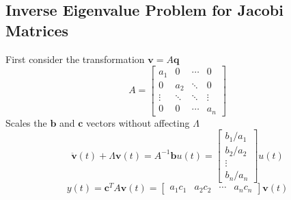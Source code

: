 \documentclass{beamer}
\begin{document}
\subsection{Inverse Eigenvalue Problem for Jacobi Matrices}
\begin{frame}
First consider the transformation $\mathbf{v} = A \mathbf{q}$
$$A = \begin{bmatrix}
a_1  &  0 & \cdots & 0 \\
0 & a_2  & \ddots & 0 \\
\vdots & \ddots & \ddots & \vdots \\
0 & 0 & \cdots & a_n \end{bmatrix}$$
Scales the $\mathbf{b}$ and $\mathbf{c}$ vectors without affecting $\Lambda$
\begin{equation}
\ddot{\mathbf{v}}(t) +  \Lambda \mathbf{v}(t) =  A^{-1} \mathbf{b}u(t) =  \begin{bmatrix} b_1/a_1 \\ b_2/a_2 \\ \vdots \\ b_n/a_n  \end{bmatrix} u(t)
\label{eq:scaled1}
\end{equation}
\begin{equation}
y(t) = \mathbf{c}^T  A \mathbf{v}(t) = \begin{bmatrix} a_1 c_1 & a_2 c_2 & \cdots & a_n c_n \end{bmatrix} \mathbf{v}(t)
\label{eq:scaled2}
\end{equation}
\end{frame}
\end{document}
